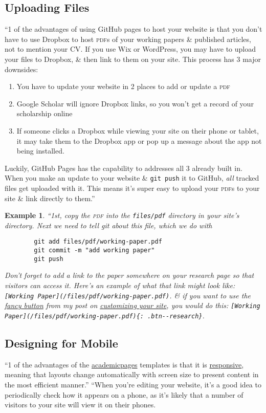 \documentclass{article}
\numberwithin{equation}{section}
\newtheorem{example}{Example}[section]
\begin{document}
\subsection{Uploading Files}
``1 of the advantages of using GitHub pages to host your website is that you don't have to use Dropbox to host \textsc{pdf}s of your working papers \& published articles, not to mention your CV. If you use Wix or WordPress, you may have to upload your files to Dropbox, \& then link to them on your site. This process has 3 major downsides:
\begin{enumerate}
	\item You have to update your website in 2 places to add or update a \textsc{pdf}
	\item Google Scholar will ignore Dropbox links, so you won't get a record of your scholarship online
	\item If someone clicks a Dropbox while viewing your site on their phone or tablet, it may take them to the Dropbox app or pop up a message about the app not being installed.
\end{enumerate}
 Luckily, GitHub  Pages has the capability to addresses all 3 already built in. When you make an update to your website \& \texttt{git push} it to GitHub, \textit{all} tracked files get uploaded with it. This means it's super easy to upload your \textsc{pdf}s to your site \& link directly to them.''

\begin{example}
	``1st, copy the \textsc{pdf} into the \verb|files/pdf| directory in your site's directory. Next we need to tell git about this file, which we do with
	\begin{verbatim}
		git add files/pdf/working-paper.pdf
		git commit -m "add working paper"
		git push
	\end{verbatim}
	Don't forget to add a link to the paper somewhere on your research page so that visitors can access it. Here's an example of what that link might look like: \verb|[Working Paper](/files/pdf/working-paper.pdf)|. \& if you want to use the \href{https://jayrobwilliams.com/posts/2020/07/customizing-website/#pushing-buttons}{fancy button} from my post on \href{https://jayrobwilliams.com/posts/2020/07/customizing-website/}{customizing your site}, you would do this: \verb|[Working Paper](/files/pdf/working-paper.pdf){: .btn--research}|.
\end{example}

\subsection{Designing for Mobile}
``1 of the advantages of the \href{https://academicpages.github.io/}{academicpages} templates is that it is \href{https://en.wikipedia.org/wiki/Responsive_web_design}{responsive}, meaning that layouts change automatically with screen size to present content in the most efficient manner.'' ``When you're editing your website, it's a good idea to periodically check how it appears on a phone, as it's likely that a number of visitors to your site will view it on their phones.
\end{document}
